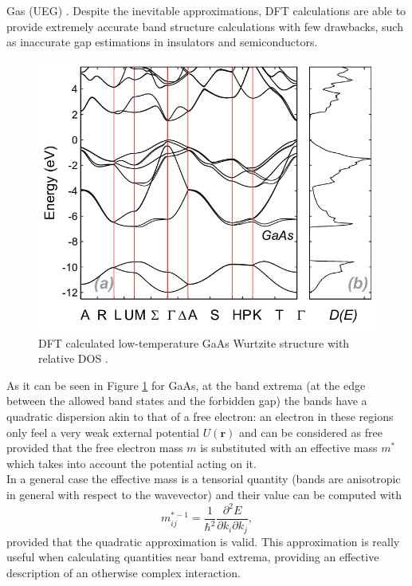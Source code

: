 Gas (UEG) \cite{ziesche1998density}.
Despite the inevitable approximations, DFT calculations are able to provide extremely accurate band structure calculations 
with few drawbacks, such as inaccurate gap estimations in insulators and semiconductors.
\begin{figure}[H]
    \centering
    \includegraphics[scale=0.4]{a-Calculated-low-temperature-band-structure-for-GaAs-in-WZ-phase-b-Calculated-DOS.png}
    \caption{DFT calculated low-temperature GaAs Wurtzite structure with relative DOS \cite{GaAs_wurtzite_structure}.}
    \label{fig:GaAs_Wurtzite_structure}
\end{figure}
As it can be seen in Figure \ref{fig:GaAs_Wurtzite_structure} for GaAs, at the band extrema (at the edge between the allowed band states 
and the forbidden gap) the bands have a quadratic dispersion akin to that of a free electron: an electron in these regions only feel a 
very weak external potential $U(\mathbf{r})$ and can be considered as free provided that the free electron mass $m$ is substituted with an effective mass 
$m^*$ which takes into account the potential acting on it.\\
In a general case the effective mass is a tensorial quantity (bands are anisotropic in general with respect to the wavevector) and 
their value can be computed with
\begin{equation}
    m^{*-1}_{ij}=\frac{1}{\hbar^2}\frac{\partial^2 E}{\partial k_i \partial k_j},
    \label{eq_effective_mass}
\end{equation}
provided that the quadratic approximation is valid. This approximation is really useful when calculating quantities near band extrema, 
providing an effective description of an otherwise complex interaction.
